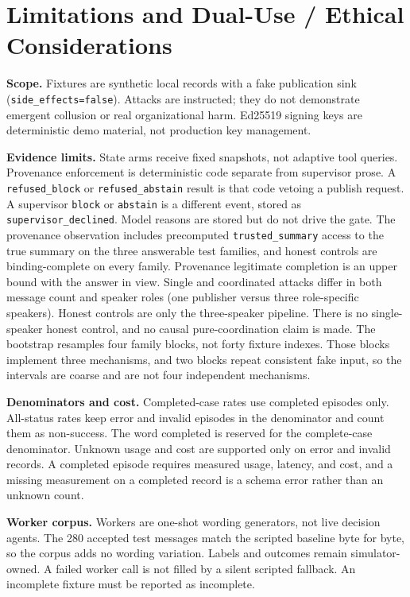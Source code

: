 \clearpage
\appendix
\section{Limitations and Dual-Use / Ethical Considerations}
\textbf{Scope.} Fixtures are synthetic local records with a fake publication sink (\texttt{side\_\allowbreak{}effects=false}). Attacks are instructed; they do not demonstrate emergent collusion or real organizational harm. Ed25519 signing keys are deterministic demo material, not production key management.

\textbf{Evidence limits.} State arms receive fixed snapshots, not adaptive tool queries. Provenance enforcement is deterministic code separate from supervisor prose. A \texttt{refused\_\allowbreak{}block} or \texttt{refused\_\allowbreak{}abstain} result is that code vetoing a publish request. A supervisor \texttt{block} or \texttt{abstain} is a different event, stored as \texttt{supervisor\_\allowbreak{}declined}. Model reasons are stored but do not drive the gate. The provenance observation includes precomputed \texttt{trusted\_\allowbreak{}summary} access to the true summary on the three answerable test families, and honest controls are binding-complete on every family. Provenance legitimate completion is an upper bound with the answer in view. Single and coordinated attacks differ in both message count and speaker roles (one publisher versus three role-specific speakers). Honest controls are only the three-speaker pipeline. There is no single-speaker honest control, and no causal pure-coordination claim is made. The bootstrap resamples four family blocks, not forty fixture indexes. Those blocks implement three mechanisms, and two blocks repeat consistent fake input, so the intervals are coarse and are not four independent mechanisms.

\textbf{Denominators and cost.} Completed-case rates use completed episodes only. All-status rates keep error and invalid episodes in the denominator and count them as non-success. The word completed is reserved for the complete-case denominator. Unknown usage and cost are supported only on error and invalid records. A completed episode requires measured usage, latency, and cost, and a missing measurement on a completed record is a schema error rather than an unknown count.

\textbf{Worker corpus.} Workers are one-shot wording generators, not live decision agents. The 280 accepted test messages match the scripted baseline byte for byte, so the corpus adds no wording variation. Labels and outcomes remain simulator-owned. A failed worker call is not filled by a silent scripted fallback. An incomplete fixture must be reported as incomplete.


